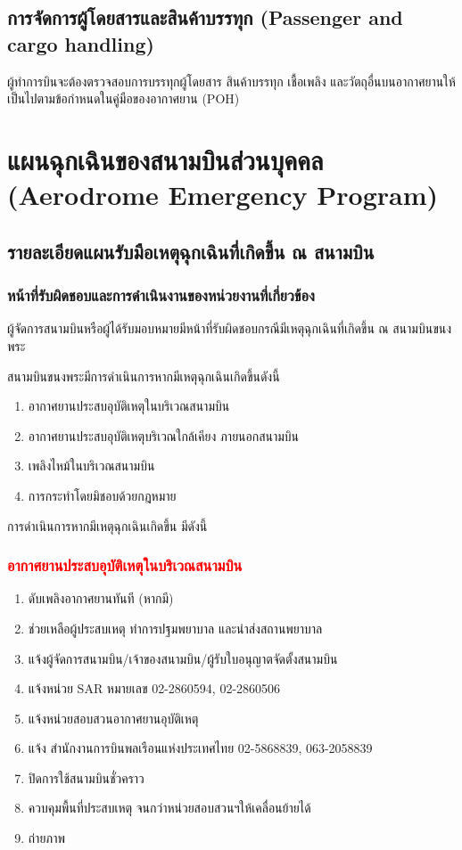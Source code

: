\subsection{การจัดการผู้โดยสารและสินค้าบรรทุก (Passenger and cargo handling)}

ผู้ทำการบินจะต้องตรวจสอบการบรรทุกผู้โดยสาร สินค้าบรรทุก เชื้อเพลิง และวัตถุอื่นบนอากาศยานให้เป็นไปตามข้อกำหนดในคู่มือของอากาศยาน (POH)

\section{แผนฉุกเฉินของสนามบินส่วนบุคคล (Aerodrome Emergency Program)}

\subsection{รายละเอียดแผนรับมือเหตุฉุกเฉินที่เกิดขึ้น ณ สนามบิน}

\subsubsection{หน้าที่รับผิดชอบและการดำเนินงานของหน่วยงานที่เกี่ยวข้อง}\label{หน้าที่รับผิดชอบและการดำเนินงานของหน่วยงานที่เกี่ยวข้อง}

ผู้จัดการสนามบินหรือผู้ได้รับมอบหมายมีหน้าที่รับผิดชอบกรณีมีเหตุฉุกเฉินที่เกิดขึ้น ณ สนามบินขนงพระ

สนามบินขนงพระมีการดำเนินการหากมีเหตุฉุกเฉินเกิดขึ้นดังนี้

\begin{enumerate}
\item อากาศยานประสบอุบัติเหตุในบริเวณสนามบิน
\item อากาศยานประสบอุบัติเหตุบริเวณใกล้เคียง ภายนอกสนามบิน
\item เพลิงไหม้ในบริเวณสนามบิน
\item การกระทำโดยมิชอบด้วยกฎหมาย
\end{enumerate}

การดำเนินการหากมีเหตุฉุกเฉินเกิดขึ้น มีดังนี้


\subsubsection{\textcolor{red}{อากาศยานประสบอุบัติเหตุในบริเวณสนามบิน}}

	\begin{enumerate}
	\item ดับเพลิงอากาศยานทันที (หากมี)
	\item ช่วยเหลือผู้ประสบเหตุ ทำการปฐมพยาบาล และนำส่งสถานพยาบาล
	\item แจ้งผู้จัดการสนามบิน/เจ้าของสนามบิน/ผู้รับใบอนุญาตจัดตั้งสนามบิน
	\item แจ้งหน่วย SAR หมายเลข 02-2860594, 02-2860506
	\item แจ้งหน่วยสอบสวนอากาศยานอุบัติเหตุ
	\item แจ้ง สำนักงานการบินพลเรือนแห่งประเทศไทย 02-5868839, 063-2058839
	\item ปิดการใช้สนามบินชั่วคราว 
	\item ควบคุมพื้นที่ประสบเหตุ จนกว่าหน่วยสอบสวนฯให้เคลื่อนย้ายได้
	\item ถ่ายภาพ
	\end{enumerate}

